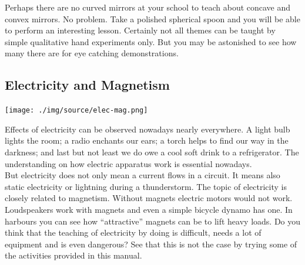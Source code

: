 \begin{multicols}{2}
Perhaps there are no curved mirrors at your school to teach about concave and convex mirrors. No problem. Take a polished spherical spoon and you will be able to perform an interesting lesson. Certainly not all themes can be taught by simple qualitative hand experiments only. But you may be astonished to see how many there are for eye catching demonstrations.

\subsection{Electricity and Magnetism}

\begin{center}
\texttt{[image: ./img/source/elec-mag.png]}
\end{center}

Effects of electricity can be observed nowadays nearly everywhere. A light bulb lights the
room; a radio enchants our ears; a torch helps to find our way in the darkness; and last but
not least we do owe a cool soft drink to a refrigerator. The understanding on how electric
apparatus work is essential nowadays.\\

But electricity does not only mean a current flows in a circuit. It means also static electricity or lightning during a thunderstorm. The topic of electricity is closely related to magnetism.
Without magnets electric motors would not work. Loudspeakers work with magnets and even
a simple bicycle dynamo has one. In harbours you can see how ``attractive'' magnets can be
to lift heavy loads. Do you think that the teaching of electricity by doing is difficult, needs a lot
of equipment and is even dangerous? See that this is not the case by trying some of the activities provided in this manual.



\end{multicols}

\pagebreak